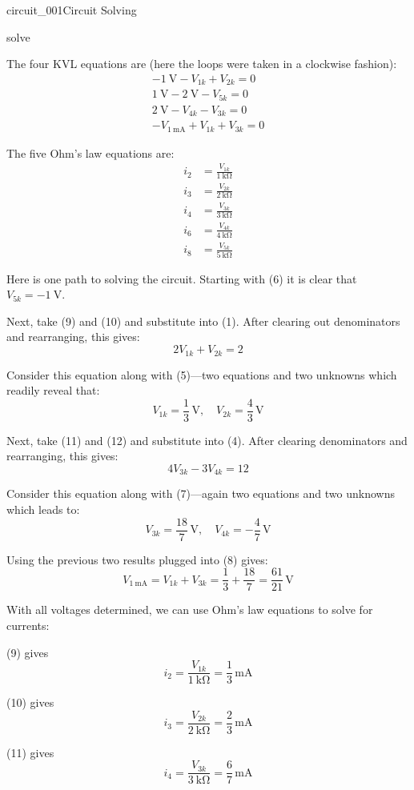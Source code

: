 \begin{mainquestion}{circuit_001}{Circuit Solving}
\begin{partquestion}{solve}
\begin{answer}
The four KVL equations are (here the loops were taken in a clockwise fashion):
\begin{gather}
-\qty{1}{\volt} - V_{1k} + V_{2k} = 0 \\
\qty{1}{\volt} - \qty{2}{\volt} - V_{5k} = 0 \\
\qty{2}{\volt} - V_{4k} - V_{3k} = 0 \\
-V_{\qty{1}{\milli\ampere}} + V_{1k} + V_{3k} = 0
\end{gather}

The five Ohm’s law equations are:
\begin{align}
i_2 &= \frac{V_{1k}}{\qty{1}{\kilo\ohm}} \\
i_3 &= \frac{V_{2k}}{\qty{2}{\kilo\ohm}} \\
i_4 &= \frac{V_{3k}}{\qty{3}{\kilo\ohm}} \\
i_6 &= \frac{V_{4k}}{\qty{4}{\kilo\ohm}} \\
i_8 &= \frac{V_{5k}}{\qty{5}{\kilo\ohm}}
\end{align}

Here is one path to solving the circuit. Starting with (6) it is clear that
$V_{5k} = -\qty{1}{\volt}$.

Next, take (9) and (10) and substitute into (1). After clearing out denominators and rearranging, this gives:
\[
2V_{1k} + V_{2k} = 2
\]

Consider this equation along with (5)—two equations and two unknowns which readily reveal that:
\[
V_{1k} = \frac{1}{3}\,\mathrm{V}, \quad
V_{2k} = \frac{4}{3}\,\mathrm{V}
\]

Next, take (11) and (12) and substitute into (4). After clearing denominators and rearranging, this gives:
\[
4V_{3k} - 3V_{4k} = 12
\]

Consider this equation along with (7)—again two equations and two unknowns which leads to:
\[
V_{3k} = \frac{18}{7}\,\mathrm{V}, \quad
V_{4k} = -\frac{4}{7}\,\mathrm{V}
\]

Using the previous two results plugged into (8) gives:
\[
V_{\qty{1}{\milli\ampere}} = V_{1k} + V_{3k}
= \frac{1}{3} + \frac{18}{7}
= \frac{61}{21}\,\mathrm{V}
\]

With all voltages determined, we can use Ohm’s law equations to solve for currents:

(9) gives
\[
i_2 = \frac{V_{1k}}{\qty{1}{\kilo\ohm}} = \frac{1}{3}\,\mathrm{mA}
\]

(10) gives
\[
i_3 = \frac{V_{2k}}{\qty{2}{\kilo\ohm}} = \frac{2}{3}\,\mathrm{mA}
\]

(11) gives
\[
i_4 = \frac{V_{3k}}{\qty{3}{\kilo\ohm}} = \frac{6}{7}\,\mathrm{mA}
\]


\end{answer}
\end{partquestion}
\end{mainquestion}
